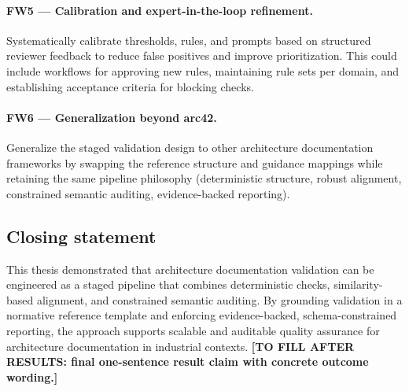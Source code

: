 \paragraph{FW5 --- Calibration and expert-in-the-loop refinement.}
Systematically calibrate thresholds, rules, and prompts based on structured reviewer feedback to reduce false positives and improve prioritization. This could include workflows for approving new rules, maintaining rule sets per domain, and establishing acceptance criteria for blocking checks.

\paragraph{FW6 --- Generalization beyond arc42.}
Generalize the staged validation design to other architecture documentation frameworks by swapping the reference structure and guidance mappings while retaining the same pipeline philosophy (deterministic structure, robust alignment, constrained semantic auditing, evidence-backed reporting).

\subsection{Closing statement}
\label{sec:conclusion_closing}

This thesis demonstrated that architecture documentation validation can be engineered as a staged pipeline that combines deterministic checks, similarity-based alignment, and constrained semantic auditing. By grounding validation in a normative reference template and enforcing evidence-backed, schema-constrained reporting, the approach supports scalable and auditable quality assurance for architecture documentation in industrial contexts. \textbf{[TO FILL AFTER RESULTS: final one-sentence result claim with concrete outcome wording.]}
